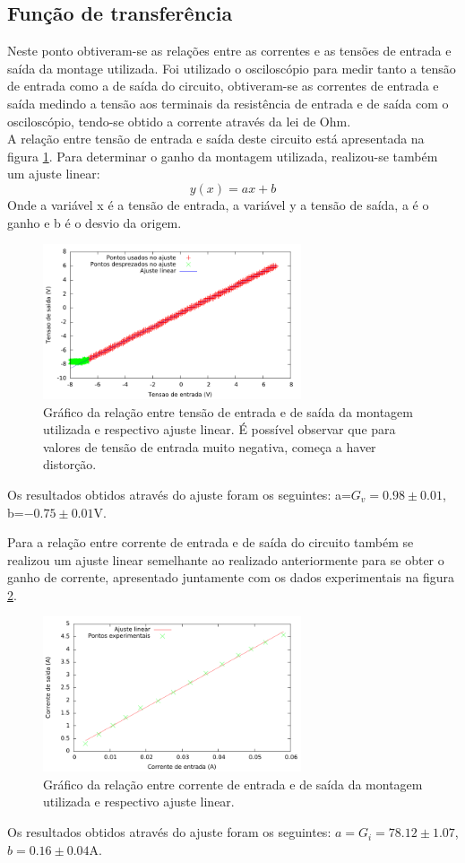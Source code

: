 \documentclass[%
  reprint,
  nofootinbib,
  amsmath,amssymb,
  aps,
  10pt,
  a4paper
]{revtex4-1}
\begin{document}
\subsection{Função de transferência}
Neste ponto obtiveram-se as relações entre as correntes e as tensões de entrada e saída da montage utilizada. Foi utilizado o osciloscópio para medir tanto a tensão de entrada como a de saída do circuito, obtiveram-se as correntes de entrada e saída medindo a tensão aos terminais da resistência de entrada e de saída com o osciloscópio, tendo-se obtido a corrente através da lei de Ohm.\\
A relação entre tensão de entrada e saída deste circuito está apresentada na figura \ref{fig:v_rel}. Para determinar o ganho da montagem utilizada, realizou-se também um ajuste linear:
\begin{equation}
y(x)=ax+b
\end{equation}
Onde a variável x é a tensão de entrada, a variável y a tensão de saída, a é o ganho e b é o desvio da origem.
\begin{figure}
\includegraphics[width=3in]{v_rel.pdf}
\caption{Gráfico da relação entre tensão de entrada e de saída da montagem utilizada e respectivo ajuste linear. É possível observar que para valores de tensão de entrada muito negativa, começa a haver distorção.}
\label{fig:v_rel}
\end{figure}
Os resultados obtidos através do ajuste foram os seguintes: a=$G_v=0.98\pm0.01$, b=$-0.75\pm0.01$V.

Para a relação entre corrente de entrada e de saída do circuito também se realizou um ajuste linear semelhante ao realizado anteriormente para se obter o ganho de corrente, apresentado juntamente com os dados experimentais na figura \ref{fig:curr_rel}.
\begin{figure}
\includegraphics[width=3in]{curr_rel.pdf}
\caption{Gráfico da relação entre corrente de entrada e de saída da montagem utilizada e respectivo ajuste linear.}
\label{fig:curr_rel}
\end{figure}
Os resultados obtidos através do ajuste foram os seguintes: $a=G_i=78.12\pm1.07$, $b=0.16\pm0.04$A. 
\end{document}
